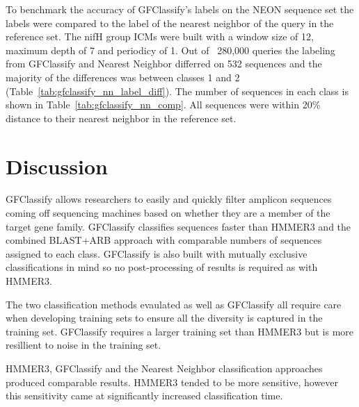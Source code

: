 \documentclass{article}
\begin{document}
To benchmark the accuracy of GFClassify's labels on the NEON sequence set the labels were compared to the label of the nearest neighbor of the query in the reference set.  The nifH group ICMs were built with a window size of 12, maximum depth of 7 and periodicy of 1.  Out of ~280,000 queries the labeling from GFClassify and Nearest Neighbor differred on 532 sequences and the majority of the differences was between classes 1 and 2 (Table~\ref{tab:gfclassify_nn_label_diff}).  The number of sequences in each class is shown in Table~\ref{tab:gfclassify_nn_comp}.  All sequences were within 20\% distance to their nearest neighbor in the reference set.

\section{Discussion}
GFClassify allows researchers to easily and quickly filter amplicon sequences coming off sequencing machines based on whether they are a member of the target gene family.  GFClassify classifies sequences faster than HMMER3 and the combined BLAST+ARB approach with comparable numbers of sequences assigned to each class.  GFClassify is also built with mutually exclusive classifications in mind so no post-processing of results is required as with HMMER3.  

The two classification methods evaulated as well as GFClassify all require care when developing training sets to ensure all the diversity is captured in the training set.  GFClassify requires a larger training set than HMMER3 but is more resillient to noise in the training set.

HMMER3, GFClassify and the Nearest Neighbor classification approaches produced comparable results. HMMER3 tended to be more sensitive, however this sensitivity came at significantly increased classification time.


\end{document}
